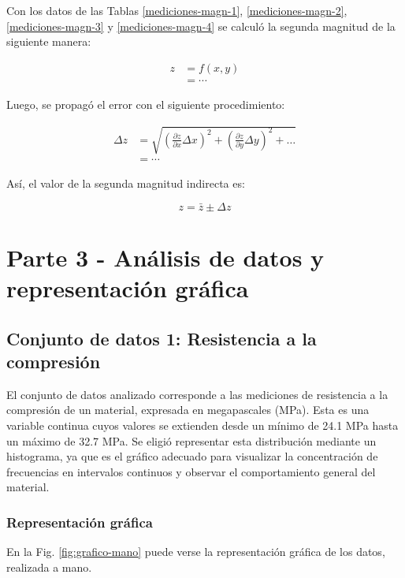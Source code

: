 \documentclass[12pt,a4paper]{article}
\begin{document}
Con los datos de las Tablas \ref{mediciones-magn-1}, \ref{mediciones-magn-2}, \ref{mediciones-magn-3} y \ref{mediciones-magn-4} se calculó la segunda magnitud de la siguiente manera:

\begin{align*}
    z &= f(x,y) \\
     &= \cdots
\end{align*}

Luego, se propagó el error con el siguiente procedimiento:

\begin{align*}
    \Delta z &= \sqrt{ \left( \frac{\partial z}{\partial x} \Delta x \right)^2 + \left( \frac{\partial z}{\partial y} \Delta y \right)^2 + \dots } \\
     &= \cdots
\end{align*}

Así, el valor de la segunda magnitud indirecta es:

\begin{equation*}
    z = \bar{z} \pm \Delta z
\end{equation*}

\newpage

\section{Parte 3 - Análisis de datos y representación gráfica} \label{Parte-3}

\subsection{Conjunto de datos 1: Resistencia a la compresión}

El conjunto de datos analizado corresponde a las mediciones de resistencia a la compresión de un material, expresada en megapascales (MPa). Esta es una variable continua cuyos valores se extienden desde un mínimo de 24.1 MPa hasta un máximo de 32.7 MPa. Se eligió representar esta distribución mediante un histograma, ya que es el gráfico adecuado para visualizar la concentración de frecuencias en intervalos continuos y observar el comportamiento general del material.

\subsubsection{Representación gráfica}

En la Fig. \ref{fig:grafico-mano} puede verse la representación gráfica de los datos, realizada a mano.
\end{document}
